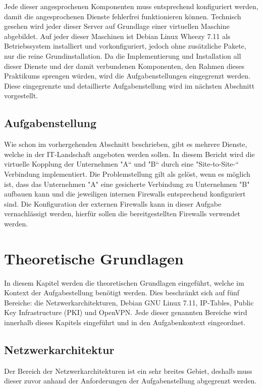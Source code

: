 \documentclass[
a4paper,     %
 headsepline, %
footsepline, %
titlepage,   %
 halfparskip,     %
 fleqn,       %
12pt         %
]{scrartcl}  %
\begin{document}
Jede dieser angesprochenen Komponenten muss entsprechend konfiguriert werden, damit die angesprochenen Dienste fehlerfrei funktionieren können.
Technisch gesehen wird jeder dieser Server auf Grundlage einer virtuellen Maschine abgebildet.
Auf jeder dieser Maschinen ist Debian Linux Wheezy 7.11 als Betriebssystem installiert und vorkonfiguriert, jedoch ohne zusätzliche Pakete, nur die reine Grundinstallation. Da die Implementierung und Installation all dieser Dienste und der damit verbundenen Komponenten, den Rahmen dieses Praktikums sprengen würden, wird die Aufgabenstellungen eingegrenzt werden. Diese eingegrenzte und detaillierte Aufgabenstellung wird im nächsten Abschnitt vorgestellt.

\subsection{Aufgabenstellung}\label{kap:Aufgabenstellung}
Wie schon im vorhergehenden Abschnitt beschrieben, gibt es mehrere Dienste, welche in der IT-Landschaft angeboten werden sollen. 
In diesem Bericht wird die virtuelle Kopplung der Unternehmen "A“ und "B“ durch eine "Site-to-Site-“ Verbindung implementiert. 
Die Problemstellung gilt als gelöst, wenn es möglich ist, dass das Unternehmen "A" eine gesicherte Verbindung zu Unternehmen "B" aufbauen kann und die jeweiligen internen Firewalls entsprechend konfiguriert sind. Die Konfiguration der externen Firewalls kann in dieser Aufgabe vernachlässigt werden, hierfür sollen die bereitgestellten Firewalls verwendet werden. 

\section{Theoretische Grundlagen}
In diesem Kapitel werden die theoretischen Grundlagen eingeführt, welche im Kontext der Aufgabestellung benötigt werden. Dies beschränkt sich auf fünf Bereiche: die Netzwerkarchitekturen, Debian GNU Linux 7.11, IP-Tables, Public Key Infrastructure (PKI) und OpenVPN. Jede dieser genannten Bereiche wird innerhalb dieses Kapitels eingeführt und in den Aufgabenkontext eingeordnet. 
\subsection{Netzwerkarchitektur}
Der Bereich der Netzwerkarchitekturen ist ein sehr breites Gebiet, deshalb muss dieser zuvor anhand der Anforderungen der Aufgabenstellung abgegrenzt werden.
\end{document}
